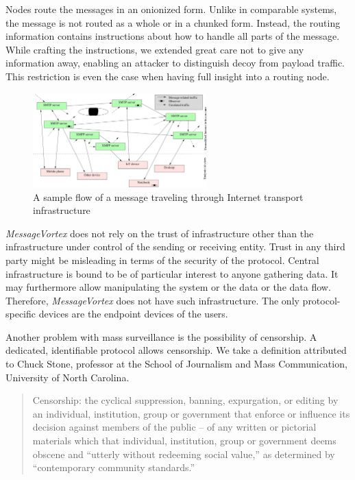 \documentclass[acmsmall, screen]{acmart}
\begin{document}
Nodes route the messages in an onionized form. Unlike in comparable systems, the message is not routed as a whole or in a chunked form. Instead, the routing information contains instructions about how to handle all parts of the message. While crafting the instructions, we extended great care not to give any information away, enabling an attacker to distinguish decoy from payload traffic. This restriction is even the case when having full insight into a routing node.

\begin{figure}[ht]
	\centering\includegraphics[width=0.6\textwidth]{internet_overview}
	\caption{A sample flow of a message traveling through Internet transport infrastructure}
	\label{fig:inet_overview}
\end{figure}


\emph{MessageVortex} does not rely on the trust of infrastructure other than the infrastructure under control of the sending or receiving entity. Trust in any third party might be misleading in terms of the security of the protocol. Central infrastructure is bound to be of particular interest to anyone gathering data. It may furthermore allow manipulating the system or the data or the data flow. Therefore, \emph{MessageVortex} does not have such infrastructure. The only protocol-specific devices are the endpoint devices of the users.

Another problem with mass surveillance is the possibility of censorship. A dedicated, identifiable protocol allows censorship. We take a definition attributed to Chuck Stone, professor at the School of Journalism and Mass Communication, University of North Carolina. 

\begin{quote}
	Censorship: the cyclical suppression, banning, expurgation, or editing by an individual, institution, group or government that enforce or influence its decision against members of the public -- of any written or pictorial materials which that individual, institution, group or government deems obscene and ``utterly without redeeming social value,'' as determined by ``contemporary community standards.''
\end{quote}
\end{document}
